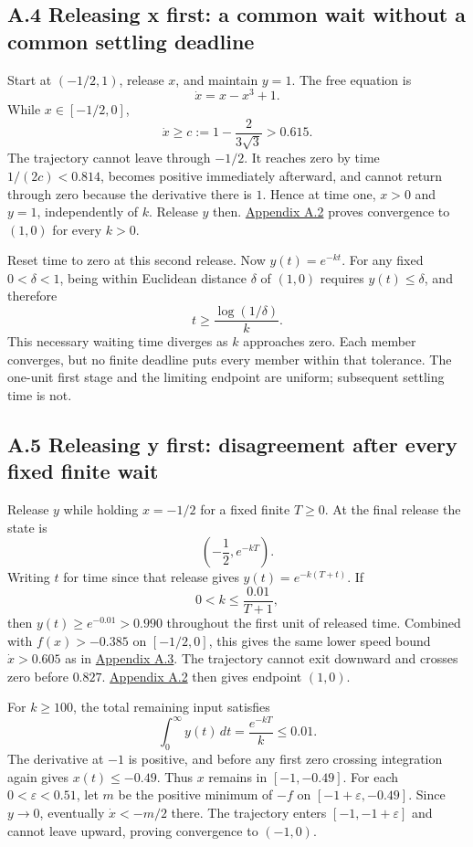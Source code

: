 \subsection*{A.4 Releasing x first: a common wait without a common settling deadline}\label{app:a.4}

Start at \((-1/2,1)\), release \(x\), and maintain \(y=1\). The free equation is
\[
\dot x=x-x^3+1.
\]
While \(x\in[-1/2,0]\),
\[
\dot x\geq c:=1-\frac{2}{3\sqrt3}>0.615.
\]
The trajectory cannot leave through \(-1/2\). It reaches zero by time \(1/(2c)<0.814\), becomes positive immediately afterward, and cannot return through zero because the derivative there is \(1\). Hence at time one, \(x>0\) and \(y=1\), independently of \(k\). Release \(y\) then. \hyperref[app:a.2]{Appendix A.2} proves convergence to \((1,0)\) for every \(k>0\).

Reset time to zero at this second release. Now \(y(t)=e^{-kt}\). For any fixed \(0<\delta<1\), being within Euclidean distance \(\delta\) of \((1,0)\) requires \(y(t)\leq\delta\), and therefore
\[
t\geq\frac{\log(1/\delta)}{k}.
\]
This necessary waiting time diverges as \(k\) approaches zero. Each member converges, but no finite deadline puts every member within that tolerance. The one-unit first stage and the limiting endpoint are uniform; subsequent settling time is not.

\subsection*{A.5 Releasing y first: disagreement after every fixed finite wait}\label{app:a.5}

Release \(y\) while holding \(x=-1/2\) for a fixed finite \(T\geq0\). At the final release the state is
\[
\left(-\frac12,e^{-kT}\right).
\]
Writing \(t\) for time since that release gives \(y(t)=e^{-k(T+t)}\). If
\[
0<k\leq\frac{0.01}{T+1},
\]
then \(y(t)\geq e^{-0.01}>0.990\) throughout the first unit of released time. Combined with \(f(x)>-0.385\) on \([-1/2,0]\), this gives the same lower speed bound \(\dot x>0.605\) as in \hyperref[app:a.3]{Appendix A.3}. The trajectory cannot exit downward and crosses zero before \(0.827\). \hyperref[app:a.2]{Appendix A.2} then gives endpoint \((1,0)\).

For \(k\geq100\), the total remaining input satisfies
\[
\int_0^\infty y(t)\,dt=\frac{e^{-kT}}{k}\leq0.01.
\]
The derivative at \(-1\) is positive, and before any first zero crossing integration again gives \(x(t)\leq-0.49\). Thus \(x\) remains in \([-1,-0.49]\). For each \(0<\varepsilon<0.51\), let \(m\) be the positive minimum of \(-f\) on \([-1+\varepsilon,-0.49]\). Since \(y\to0\), eventually \(\dot x<-m/2\) there. The trajectory enters \([-1,-1+\varepsilon]\) and cannot leave upward, proving convergence to \((-1,0)\).

